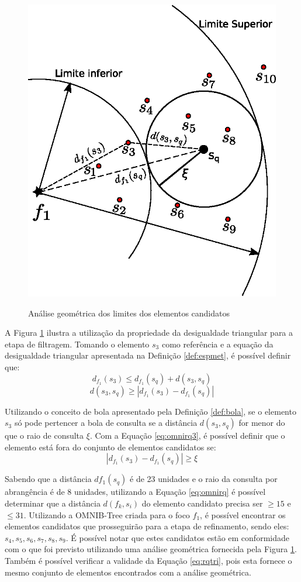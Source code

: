 \begin{figure}[H]
\centering
\caption{Análise geométrica dos limites dos elementos candidatos}
\includegraphics[width=.55\textwidth]{dados/figuras/rg_ex2.eps}
\label{fig:rgex2}
\end{figure}
A Figura \ref{fig:rgex2} ilustra a utilização da propriedade da desigualdade triangular para a etapa de filtragem. Tomando o elemento $s_3$ como referência e a equação da desigualdade triangular apresentada
na Definição \ref{def:espmet}, é possível definir que:
\begin{equation} \label{eq:omnirq2}
d_{f_1}(s_3) \leq d_{f_1}(s_q) + d(s_3, s_q)
\end{equation}
\begin{equation} \label{eq:omnirq3}
d(s_3, s_q) \geq |d_{f_1}(s_3) - d_{f_1}(s_q)|
\end{equation}\par
Utilizando o conceito de bola apresentado pela Definição \ref{def:bola}, se o elemento $s_3$ só pode pertencer a bola de consulta se a distância
$d(s_3, s_q)$ for menor do que o raio de consulta $\xi$. Com a Equação \ref{eq:omnirq3}, é possível definir que o elemento está fora do conjunto
de elementos candidatos se:
\begin{equation} \label{eq:rqtri}
 |d_{f_1}(s_3) - d_{f_1}(s_q)| \geq \xi
\end{equation}\par
Sabendo que a distância $df_1(s_q)$ é de 23 unidades e o raio da consulta por abrangência é de 8 unidades, utilizando a Equação \ref{eq:omnirq} é possível determinar que a distância $d(f_k, s_i)$ do elemento candidato precisa ser $\geq 15$ e $\leq 31$.
Utilizando a OMNIB-Tree criada para o foco $f_1$, é possível encontrar os elementos candidatos que prosseguirão para a etapa de refinamento, sendo eles: $s_4, s_5, s_6, s_7, s_8, s_9$. É possível notar que estes candidatos estão em conformidade com o que
foi previsto utilizando uma análise geométrica fornecida pela Figura \ref{fig:rgex2}. Também é possível verificar a validade da Equação
\ref{eq:rqtri}, pois esta fornece o mesmo conjunto de elementos encontrados com a análise geométrica.\par


